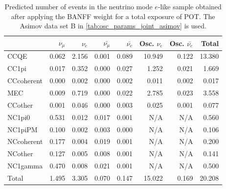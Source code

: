 
\begin{table}
\center
\begin{tabular} { | l ||r | r | r | r | r | r | | r | }
\hline
              & $\nu_\mu$            & $\nu_e$              & $\bar{\nu_\mu}$      & $\bar{\nu_e}$        & Osc. $\nu_e$         & Osc. $\bar{\nu_e}$   & Total                \\ \hline\hline
 CCQE         & 0.062                & 2.156                & 0.001                & 0.089                & 10.949               & 0.122                & 13.380               \\ \hline
 CC1pi        & 0.017                & 0.352                & 0.000                & 0.027                & 1.252                & 0.021                & 1.669                \\ \hline
 CCcoherent   & 0.000                & 0.002                & 0.000                & 0.002                & 0.011                & 0.002                & 0.017                \\ \hline
 MEC          & 0.009                & 0.719                & 0.000                & 0.022                & 2.785                & 0.023                & 3.558                \\ \hline
 CCother      & 0.001                & 0.046                & 0.000                & 0.003                & 0.025                & 0.001                & 0.077                \\ \hline
 NC1pi0       & 0.531                & 0.012                & 0.017                & 0.001                & N/A                  & N/A                  & 0.560                \\ \hline
 NC1piPM      & 0.100                & 0.002                & 0.003                & 0.000                & N/A                  & N/A                  & 0.106                \\ \hline
 NCcoherent   & 0.177                & 0.004                & 0.019                & 0.001                & N/A                  & N/A                  & 0.200                \\ \hline
 NCother      & 0.127                & 0.005                & 0.008                & 0.001                & N/A                  & N/A                  & 0.141                \\ \hline
 NC1gamma     & 0.470                & 0.008                & 0.021                & 0.001                & N/A                  & N/A                  & 0.500                \\ \hline
\hline
 Total        & 1.495                & 3.305                & 0.070                & 0.147                & 15.022               & 0.169                & 20.208               \\ \hline

\end{tabular}
\caption{
Predicted number of events in the neutrino mode $e$-like sample
obtained after applying the BANFF weight
for a total exposure of \TotalPotNuRunOneSevenB{} POT.
The Asimov data set B in \cref{tab:osc_params_joint_asimov} is used.
}
\label{tab:events_1re_Asimov_B_Run17b}
\end{table}


